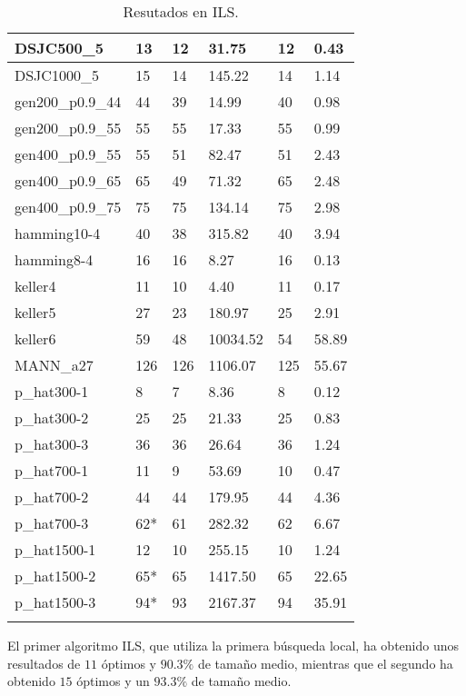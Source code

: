 \begin{small}
\begin{longtable}{l l l l l l}
    DSJC500\_5         & 13 & 12 & 31.75 & 12 & 0.43\\ \hline
    DSJC1000\_5        & 15 & 14 & 145.22 & 14 & 1.14\\ \hline
    gen200\_p0.9\_44   & 44 & 39 & 14.99 & 40 & 0.98\\ \hline
    gen200\_p0.9\_55   & 55 & 55 & 17.33 & 55 & 0.99\\ \hline
    gen400\_p0.9\_55   & 55 & 51 & 82.47 & 51 & 2.43 \\ \hline
    gen400\_p0.9\_65   & 65 & 49 & 71.32 & 65 & 2.48 \\ \hline
    gen400\_p0.9\_75   & 75 & 75 & 134.14 & 75 & 2.98 \\ \hline
    hamming10-4        & 40 & 38 & 315.82 & 40 & 3.94\\ \hline
    hamming8-4         & 16 & 16 & 8.27 & 16 & 0.13\\ \hline
    keller4            & 11 & 10 & 4.40 & 11 & 0.17 \\ \hline
    keller5            & 27 & 23 & 180.97 & 25 & 2.91 \\ \hline
    keller6            & 59 & 48 & 10034.52 & 54 & 58.89\\ \hline
    MANN\_a27          & 126 & 126 & 1106.07 & 125 & 55.67 \\ \hline
    p\_hat300-1        & 8 & 7 & 8.36 & 8 & 0.12 \\ \hline
    p\_hat300-2        & 25 & 25 & 21.33 & 25 & 0.83\\ \hline
    p\_hat300-3        & 36 & 36 & 26.64 & 36 & 1.24\\ \hline
    p\_hat700-1        & 11 & 9 & 53.69 & 10 & 0.47\\ \hline
    p\_hat700-2        & 44 & 44 & 179.95 & 44 & 4.36\\ \hline
    p\_hat700-3        & 62* & 61 & 282.32 & 62 & 6.67 \\ \hline
    p\_hat1500-1       & 12 & 10 & 255.15 & 10 & 1.24\\ \hline
    p\_hat1500-2       & 65* & 65 & 1417.50 & 65 & 22.65\\ \hline
    p\_hat1500-3       & 94* & 93 & 2167.37 & 94 & 35.91\\ \hline
  \caption{Resutados en ILS.}
\end{longtable}
\end{small}

El primer algoritmo ILS, que utiliza la primera búsqueda local, ha obtenido
unos resultados de $11$ óptimos y $90.3\%$ de tamaño medio, mientras que el
segundo ha obtenido $15$ óptimos y un $93.3\%$ de tamaño medio.

